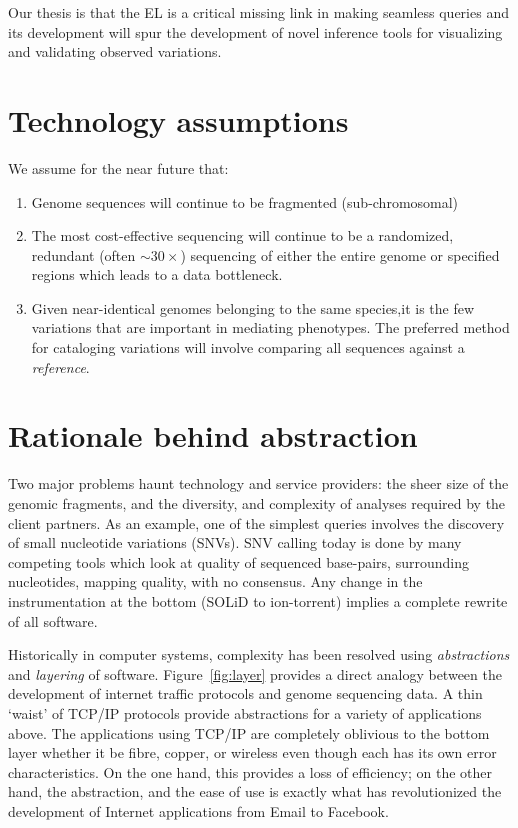 \documentclass[11pt]{article}
\begin{document}
Our thesis is that the EL is a critical missing link in making
seamless queries and its development will spur the development of
novel inference tools for visualizing and validating observed
variations.

\section{Technology assumptions}

We assume for the near future that:

\begin{enumerate}
\item Genome sequences will continue to be fragmented
  (sub-chromosomal)
\item The most cost-effective sequencing will continue to be a
  randomized, redundant (often $\sim 30\times$) sequencing of either the entire genome or
  specified regions which leads to a data bottleneck.
\item Given near-identical genomes belonging to the same species,it is the few variations that
  are important in mediating phenotypes. The preferred method for
  cataloging variations will involve comparing all sequences against a
  \emph{reference}.
\end{enumerate}

\section{Rationale behind abstraction}

Two major problems haunt technology and service providers: the sheer
size of the genomic fragments, and the diversity, and
complexity of analyses required by the client partners. As an example, one of the 
simplest queries involves the discovery of small nucleotide
variations (SNVs). SNV calling today is done by many competing tools
which look at quality of sequenced base-pairs, surrounding
nucleotides, mapping quality, with no consensus. Any change in the instrumentation at 
the bottom (SOLiD to
ion-torrent) implies a complete rewrite of all software.

Historically in computer systems, complexity has been resolved using
\emph{abstractions} and \emph{layering} of software.
Figure~\ref{fig:layer} provides a direct analogy between the
development of internet traffic protocols and genome sequencing data.
A thin `waist' of TCP/IP protocols provide abstractions for a variety
of applications above. The applications using TCP/IP are completely
oblivious to the bottom layer whether it be fibre, copper, or wireless
even though each has its own error characteristics.  On the one hand,
this provides a loss of efficiency; on the other hand, the
abstraction, and the ease of use is exactly what has revolutionized
the development of Internet applications from Email to Facebook.
\end{document}

